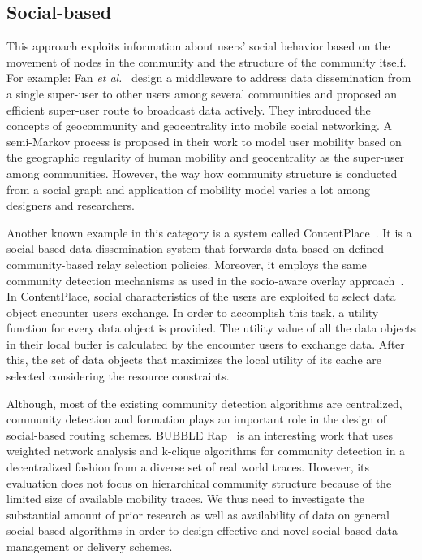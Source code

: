 \subsection{Social-based}\label{Chap2_03_03}
This approach exploits information about users' social behavior based on the movement of nodes in the community and the structure of the community itself. For example: Fan {\it et al.}~\cite{JFan2013} design a middleware to address data dissemination from a single super-user to other users among several communities and proposed an efficient super-user route to broadcast data actively. They introduced the concepts of geocommunity and geocentrality into mobile social networking. A semi-Markov process is proposed in their work to model user mobility based on the geographic regularity of human mobility and geocentrality as the super-user among communities. However, the way how community structure is conducted from a social graph and application of mobility model varies a lot among designers and researchers.

Another known example in this category is a system called ContentPlace~\cite{CBoldrini2010}. It is a social-based data dissemination system that forwards data based on defined community-based relay selection policies. Moreover, it employs the same community detection mechanisms as used in the socio-aware overlay approach~\cite{EYoneki2007}. In ContentPlace, social characteristics of the users are exploited to select data object encounter users exchange. In order to accomplish this task, a utility function for every data object is provided. The utility value of all the data objects in their local buffer is calculated by the encounter users to exchange data. After this, the set of data objects that maximizes the local utility of its cache are selected considering the resource constraints.

Although, most of the existing community detection algorithms are centralized, community detection and formation plays an important role in the design of social-based routing schemes. BUBBLE Rap~\cite{PHui2011} is an interesting work that uses weighted network analysis and k-clique algorithms for community detection in a decentralized fashion from a diverse set of real world traces. However, its evaluation does not focus on hierarchical community structure because of the limited size of available mobility traces. We thus need to investigate the substantial amount of prior research as well as availability of data on general social-based algorithms in order to design effective and novel social-based data management or delivery schemes.

